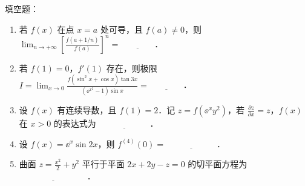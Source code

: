 
填空题：
\begin{enumerate}[label=(\arabic*)]
  \item 若 $f(x)$ 在点 $x=a$ 处可导，且 $f(a)\neq 0$，则 $\displaystyle \lim_{n\to+\infty}\left[\frac{f(a+1/n)}{f(a)}\right]^{n}=\underline{\hspace{4em}}$．
  \item 若 $f(1)=0$，$f'(1)$ 存在，则极限 $\displaystyle I=\lim_{x\to 0}\frac{f(\sin^2x+\cos x)\tan 3x}{\left(\ee^{x^2}-1\right)\sin x}=\underline{\hspace{4em}}$．
  \item 设 $f(x)$ 有连续导数，且 $f(1)=2$．记 $z=f(\ee^xy^2)$，若 $\displaystyle \frac{\partial z}{\partial x}=z$，$f(x)$ 在 $x>0$ 的表达式为 $\underline{\hspace{6em}}$．
  \item 设 $f(x)=\ee^x\sin 2x$，则 $f^{(4)}(0)=\underline{\hspace{6em}}$．
  \item 曲面 $z=\frac{x^2}{2}+y^2$ 平行于平面 $2x+2y-z=0$ 的切平面方程为 $\underline{\hspace{8em}}$．
\end{enumerate}

